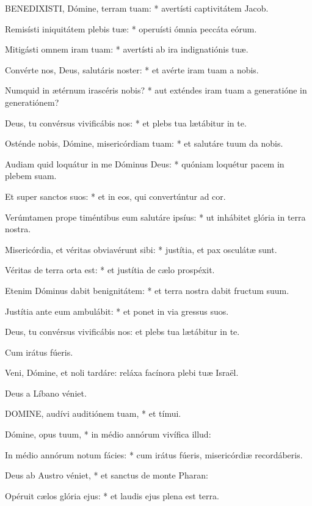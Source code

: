 \lettrine[lines=2]{B}{ENEDIXISTI}, Dómine, terram tuam: * avertísti captivitátem Jacob.

Remisísti iniquitátem plebis tuæ: * operuísti ómnia peccáta eórum.

Mitigásti omnem iram tuam: * avertísti ab ira indignatiónis tuæ.

Convérte nos, Deus, salutáris noster: * et avérte iram tuam a nobis.

Numquid in ætérnum irascéris nobis? * aut exténdes iram tuam a generatióne in generatiónem?

Deus, tu convérsus vivificábis nos: * et plebs tua lætábitur in te.

Osténde nobis, Dómine, misericórdiam tuam: * et salutáre tuum da nobis.

Audiam quid loquátur in me Dóminus Deus: * quóniam loquétur pacem in plebem suam.

Et super sanctos suos: * et in eos, qui convertúntur ad cor.

Verúmtamen prope timéntibus eum salutáre ipsíus: * ut inhábitet glória in terra nostra.

Misericórdia, et véritas obviavérunt sibi: * justítia, et pax osculátæ sunt.

Véritas de terra orta est: * et justítia de cælo prospéxit.

Etenim Dóminus dabit benignitátem: * et terra nostra dabit fructum suum.

Justítia ante eum ambulábit: * et ponet in via gressus suos.

 Deus, tu convérsus vivificábis nos: et plebs tua lætábitur in te.

 Cum irátus fúeris.

  Veni, Dómine, et noli tardáre: reláxa facínora plebi tuæ Israël.

 Deus a Líbano véniet.


\lettrine[lines=2]{D}{OMINE}, audívi auditiónem tuam, * et tímui.

Dómine, opus tuum, * in médio annórum vivífica illud:

In médio annórum notum fácies: * cum irátus fúeris, misericórdiæ recordáberis.

Deus ab Austro véniet, * et sanctus de monte Pharan:

Opéruit cælos glória ejus: * et laudis ejus plena est terra.

